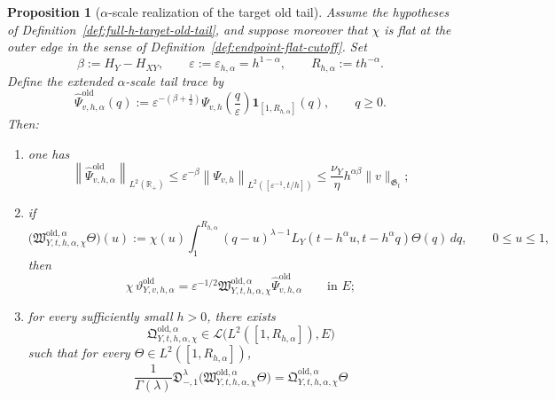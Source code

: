 \documentclass[11pt,a4paper]{amsart}
\theoremstyle{plain}
\newtheorem{proposition}[theorem]{Proposition}
\theoremstyle{definition}
\theoremstyle{remark}
\newcommand{\R}{\mathbb{R}}
\newcommand{\one}{\mathbf 1}
\begin{document}
\begin{proposition}[\(\alpha\)-scale realization of the target old tail]
\label{prop:full-h-target-old-tail-alpha}
Assume the hypotheses of Definition~\ref{def:full-h-target-old-tail}, and suppose moreover that
\(\chi\) is flat at the outer edge in the sense of Definition~\ref{def:endpoint-flat-cutoff}. Set
\[
\beta:=H_Y-H_{XY},
\qquad
\varepsilon:=\varepsilon_{h,\alpha}=h^{1-\alpha},
\qquad
R_{h,\alpha}:=th^{-\alpha}.
\]
Define the extended \(\alpha\)-scale tail trace by
\begin{equation}\label{eq:full-h-target-old-tail-alpha-trace}
\widehat\Psi_{v,h,\alpha}^{\mathrm{old}}(q)
:=
\varepsilon^{-(\beta+\frac12)}
\Psi_{v,h}\!\left(\frac{q}{\varepsilon}\right)\one_{[1,R_{h,\alpha}]}(q),
\qquad q\ge0.
\end{equation}
Then:
\begin{enumerate}[label=(\roman*)]
\item one has
\begin{equation}\label{eq:full-h-target-old-tail-alpha-trace-bound}
\left\|
\widehat\Psi_{v,h,\alpha}^{\mathrm{old}}
\right\|_{L^2(\R_+)}
\le
\varepsilon^{-\beta}
\left\|
\Psi_{v,h}
\right\|_{L^2([\varepsilon^{-1},t/h])}
\le
\frac{\nu_Y}{\eta}h^{\alpha\beta}\|v\|_{\mathfrak G_t};
\end{equation}
\item if
\begin{equation}\label{eq:full-h-target-old-tail-alpha-op}
\bigl(
\mathfrak W_{Y,t,h,\alpha,\chi}^{\mathrm{old},\alpha}\Theta
\bigr)(u)
:=
\chi(u)
\int_1^{R_{h,\alpha}}
(q-u)^{\lambda-1}
L_Y(t-h^\alpha u,t-h^\alpha q)\Theta(q)\,dq,
\qquad 0\le u\le 1,
\end{equation}
then
\begin{equation}\label{eq:full-h-target-old-tail-alpha-id}
\chi\,\vartheta_{Y,v,h,\alpha}^{\mathrm{old}}
=
\varepsilon^{-1/2}
\mathfrak W_{Y,t,h,\alpha,\chi}^{\mathrm{old},\alpha}
\widehat\Psi_{v,h,\alpha}^{\mathrm{old}}
\qquad\text{in }E;
\end{equation}
\item for every sufficiently small \(h>0\), there exists
\[
\mathfrak Q_{Y,t,h,\alpha,\chi}^{\mathrm{old},\alpha}
\in
\mathcal L\bigl(L^2([1,R_{h,\alpha}]),E\bigr)
\]
such that for every \(\Theta\in L^2([1,R_{h,\alpha}])\),
\begin{equation}\label{eq:full-h-target-old-tail-alpha-conj}
\frac{1}{\Gamma(\lambda)}
\mathfrak D_{-,1}^{\lambda}
\bigl(
\mathfrak W_{Y,t,h,\alpha,\chi}^{\mathrm{old},\alpha}\Theta
\bigr)
=
\mathfrak Q_{Y,t,h,\alpha,\chi}^{\mathrm{old},\alpha}\Theta

\end{equation}
\end{enumerate}
\end{proposition}
\end{document}

